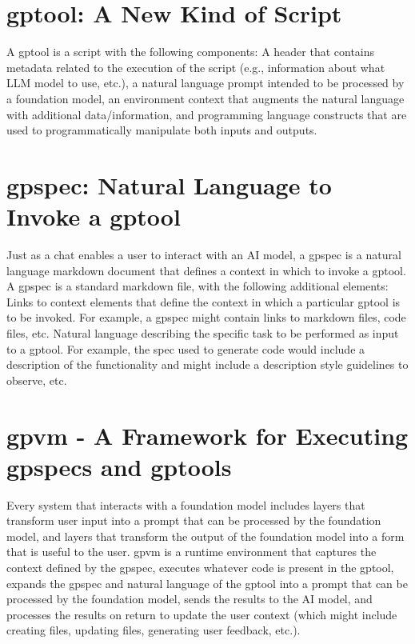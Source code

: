 \section{gptool: A New Kind of Script}

A gptool is a script with the following components: A header that contains metadata related to the execution of the script (e.g., information about what LLM model to use, etc.), a natural language prompt intended to be processed by a foundation model, an environment context that augments the natural language with additional data/information, and programming language constructs that are used to programmatically manipulate both inputs and outputs.

\section{gpspec: Natural Language to Invoke a gptool}

Just as a chat enables a user to interact with an AI model, a gpspec is a natural language markdown document that defines a context in which to invoke a gptool. A gpspec is a standard markdown file, with the following additional elements: Links to context elements that define the context in which a particular gptool is to be invoked. For example, a gpspec might contain links to markdown files, code files, etc. Natural language describing the specific task to be performed as input to a gptool. For example, the spec used to generate code would include a description of the functionality and might include a description style guidelines to observe, etc.

\section{gpvm - A Framework for Executing gpspecs and gptools}

Every system that interacts with a foundation model includes layers that transform user input into a prompt that can be processed by the foundation model, and layers that transform the output of the foundation model into a form that is useful to the user. gpvm is a runtime environment that captures the context defined by the gpspec, executes whatever code is present in the gptool, expands the gpspec and natural language of the gptool into a prompt that can be processed by the foundation model, sends the results to the AI model, and processes the results on return to update the user context (which might include creating files, updating files, generating user feedback, etc.).

